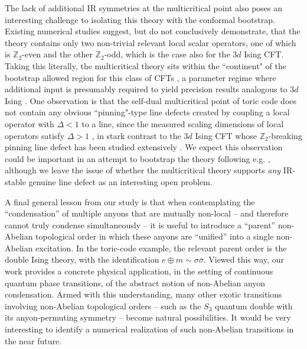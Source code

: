 \documentclass[aps, prl, superscriptaddress, twocolumn,
notitlepage, longbibliography,
floatfix]{revtex4-2}
\newcommand{\1}{\text{\uppercase\expandafter{\romannumeral1}}}
\newcommand{\2}{\text{\uppercase\expandafter{\romannumeral2}}}
\newcommand{\3}{\text{\uppercase\expandafter{\romannumeral3}}}
\newcommand{\4}{\text{\uppercase\expandafter{\romannumeral4}}}
\newcommand{\5}{\text{\uppercase\expandafter{\romannumeral5}}}
\newcommand{\6}{\text{\uppercase\expandafter{\romannumeral6}}}
\begin{document}
The lack of additional IR symmetries at the multicritical point also poses an interesting challenge to isolating this theory with the conformal bootstrap. Existing numerical studies suggest, but do not conclusively demonstrate, that the theory contains only two non-trivial relevant local scalar operators, one of which is $\mathbb Z_2$-even and the other $\mathbb Z_2$-odd, which is the case also for the $3d$ Ising CFT.  Taking this literally, the multicritical theory sits within the ``continent" of the bootstrap allowed region for this class of CFTs \cite{Kos:2014bka}, a parameter regime where additional input is presumably required to yield precision results analogous to $3d$ Ising \cite{El-Showk:2012cjh,Kos:2014bka,Chang:2024whx}. One observation is that the self-dual multicritical point of toric code does not contain any obvious ``pinning"-type line defects created by coupling a local operator with $\Delta < 1$ to a line, since the measured scaling dimensions of local operators satisfy $\Delta > 1$ \cite{SomozaSernaNahum}, in stark contrast to the $3d$ Ising CFT whose $\mathbb Z_2$-breaking pinning line defect has been studied extensively \cite{allais2014magnetic,Allais:2014fqa,Parisen_Toldin_2017,Cuomo:2021kfm,Gimenez-Grau:2022ebb,BianchiBootstrapMagneticField,Nishioka:2022qmj,Hu_2024,Zhou:2023fqu,Lanzetta:2025xfw}. We expect this observation could be important in an attempt to bootstrap the theory following e.g. \cite{El-Showk:2012cjh,Kos:2014bka,Chang:2024whx,Lanzetta:2025xfw}, although  we leave the issue of whether the multicritical theory supports \emph{any} IR-stable genuine line defect as an interesting open problem. \par
A final general lesson from our study is that when contemplating the ``condensation'' of multiple anyons that are mutually non-local -- and therefore cannot truly condense simultaneously -- it is useful to introduce a ``parent'' non-Abelian topological order in which these anyons are ``unified'' into a single non-Abelian excitation. In the toric-code example, the relevant parent order is the double Ising theory, with the identification $e\oplus m\sim \sigma\bar{\sigma}$. Viewed this way, our work provides a concrete physical application, in the setting of continuous quantum phase transitions, of the abstract notion of non-Abelian anyon condensation. Armed with this understanding, many other exotic transitions involving non-Abelian topological orders -- such as the $S_3$ quantum double with its anyon-permuting symmetry -- become natural possibilities. It would be very interesting to identify a numerical realization of such non-Abelian transitions in the near future. \par
\end{document}

